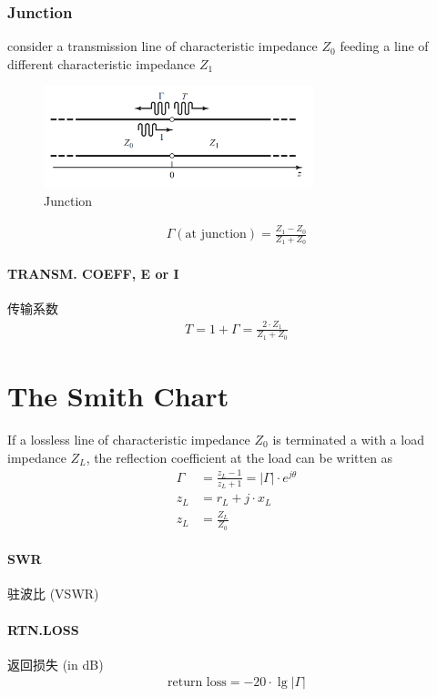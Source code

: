\documentclass[a4paper]{report}
\begin{document}
\subsubsection{Junction}
consider a transmission line of characteristic impedance $Z_0$ feeding a line of different characteristic impedance $Z_1$
\begin{figure}[H]
\centering
\includegraphics[width=0.7\textwidth]{junction.png}
\caption{Junction}
\end{figure}
\begin{align*}
\Gamma(\text{at junction})=\frac{Z_1-Z_0}{Z_1+Z_0}
\end{align*}
\paragraph{TRANSM. COEFF, E or I}传输系数
\begin{align*}
  T=1+\Gamma=\frac{2\cdot Z_1}{Z_1+Z_0}
\end{align*}

\section{The Smith Chart}
If a lossless line of characteristic impedance $Z_0$ is terminated a with a load impedance $Z_L$, the reflection coefficient at the load can be written as
\begin{align*}
  \Gamma&=\frac{z_L-1}{z_L+1}=\lvert \Gamma \rvert\cdot e^{j\theta}
  \\z_L&=r_L+j\cdot x_L
  \\z_L&=\frac{Z_L}{Z_0}
\end{align*}
\paragraph{SWR}驻波比 (VSWR)
\paragraph{RTN.LOSS}返回损失 (in dB)
\begin{align*}
  \text{return loss}=-20\cdot \lg{\lvert \Gamma \rvert}
\end{align*}
\end{document}
